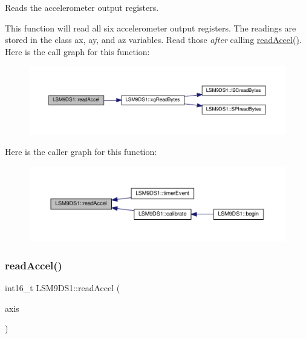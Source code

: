 Reads the accelerometer output registers. 

This function will read all six accelerometer output registers. The readings are stored in the class\textquotesingle{} ax, ay, and az variables. Read those {\itshape after} calling \hyperlink{classLSM9DS1_a9953684a1ff652a7d3a4d91e72bccaa1}{read\+Accel()}. Here is the call graph for this function\+:\nopagebreak
\begin{figure}[H]
\begin{center}
\leavevmode
\includegraphics[width=350pt]{classLSM9DS1_a9953684a1ff652a7d3a4d91e72bccaa1_cgraph}
\end{center}
\end{figure}
Here is the caller graph for this function\+:\nopagebreak
\begin{figure}[H]
\begin{center}
\leavevmode
\includegraphics[width=350pt]{classLSM9DS1_a9953684a1ff652a7d3a4d91e72bccaa1_icgraph}
\end{center}
\end{figure}
\mbox{\label{classLSM9DS1_acbe3bfc0b8db7fe3f77893d22c394594}} 
\subsubsection{\texorpdfstring{read\+Accel()}{readAccel()}\hspace{0.1cm}{\footnotesize\ttfamily [2/2]}}
{\footnotesize\ttfamily int16\+\_\+t L\+S\+M9\+D\+S1\+::read\+Accel (\begin{DoxyParamCaption}\item[{lsm9ds1\+\_\+axis}]{axis }\end{DoxyParamCaption})}



